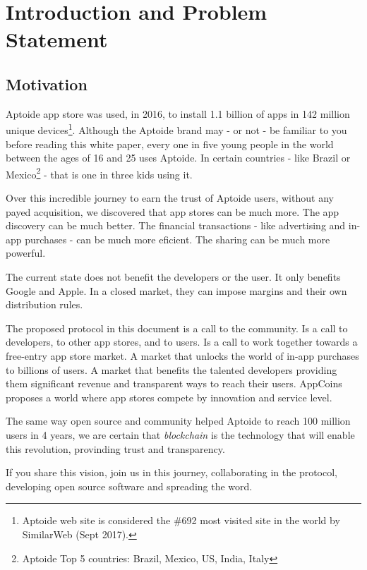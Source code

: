 


\section{Introduction and Problem Statement}
\label{sec: introduction}

\subsection{Motivation}

Aptoide app store was used, in 2016, to install 1.1 billion of apps in 142 million unique devices\footnote{Aptoide web site is considered the \#692 most visited site in the world by SimilarWeb (Sept 2017).}. Although the Aptoide brand may - or not - be familiar to you before reading this white paper, every one in five young people in the world between the ages of 16 and 25 uses Aptoide. In certain countries - like Brazil or Mexico\footnote{Aptoide Top 5 countries: Brazil, Mexico, US, India, Italy} - that is one in three kids using it. 

Over this incredible journey to earn the trust of Aptoide users, without any payed acquisition, we discovered that app stores can be much more. The app discovery can be much better. The financial transactions - like advertising and in-app purchases - can be much more eficient. The sharing can be much more powerful. 

The current state does not benefit the developers or the user. It only benefits Google and Apple. In a closed market, they can impose margins and their own distribution rules.

\medskip

The proposed protocol in this document is a call to the community. Is a call to developers, to other app stores, and to users. Is a call to work together towards a free-entry app store market. A market that unlocks the world of in-app purchases to billions of users. A market that benefits the talented developers providing them significant revenue and transparent ways to reach their users. AppCoins proposes a world where app stores compete by innovation and service level.

The same way open source and community helped Aptoide to reach 100 million users in 4 years, we are certain that {\em blockchain} is the technology that will enable this revolution, provinding trust and transparency.

If you share this vision, join us in this journey\cite{lucas}, collaborating in the protocol, developing open source software and spreading the word. 

